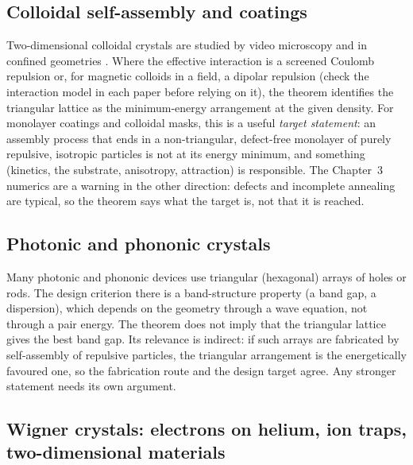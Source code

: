 \subsection{Colloidal self-assembly and coatings}

Two-dimensional colloidal crystals are studied by video microscopy \cite{zahn} and in confined geometries
\cite{bubeck}. Where the effective interaction is a screened Coulomb repulsion or, for magnetic colloids in a field,
a dipolar repulsion (check the interaction model in each paper before relying on it), the theorem identifies the
triangular lattice as the minimum-energy arrangement at the given density. For monolayer coatings and colloidal
masks, this is a useful \emph{target statement}: an assembly process that ends in a non-triangular, defect-free
monolayer of purely repulsive, isotropic particles is not at its energy minimum, and something (kinetics, the
substrate, anisotropy, attraction) is responsible. The Chapter~3 numerics are a warning in the other direction:
defects and incomplete annealing are typical, so the theorem says what the target is, not that it is reached.

\subsection{Photonic and phononic crystals}

Many photonic and phononic devices use triangular (hexagonal) arrays of holes or rods. The design criterion there is
a band-structure property (a band gap, a dispersion), which depends on the geometry through a wave equation, not
through a pair energy. The theorem does not imply that the triangular lattice gives the best band gap. Its relevance
is indirect: if such arrays are fabricated by self-assembly of repulsive particles, the triangular arrangement is
the energetically favoured one, so the fabrication route and the design target agree. Any stronger statement needs
its own argument.

\subsection{Wigner crystals: electrons on helium, ion traps, two-dimensional materials}

